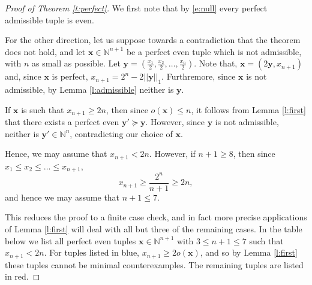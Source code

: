 \documentclass{article}
\begin{document}
\begin{proof}[Proof of Theorem \ref{t:perfect}]
We first note that by \eqref{e:null} every perfect admissible tuple is even.

For the other direction, let us suppose towards a contradiction that the theorem does not hold, and let $\bm{x} \in \mathbb{N}^{n+1}$ be a perfect even tuple which is not admissible, with $n$ as small as possible. Let $\bm{y} = \left(\frac{x_1}{2},\frac{x_2}{2},\ldots, \frac{x_n}{2}\right)$. Note that, $\bm{x} = (2\bm{y},x_{n+1})$ and, since $\bm{x}$ is perfect, $x_{n+1} = 2^n - 2||\bm{y}||_1$. Furthremore, since $\bm{x}$ is not admissible, by Lemma \ref{l:admissible} neither is $\bm{y}$.

If $\bm{x}$ is such that $x_{n+1} \geq 2n$, then since $o(\bm{x}) \leq n$, it follows from Lemma \ref{l:first} that there exists a perfect even $\bm{y'} \succeq \bm{y}$. However, since $\bm{y}$ is not admissible, neither is $\bm{y'} \in \mathbb{N}^n$, contradicting our choice of $\bm{x}$.

Hence, we may assume that $x_{n+1} < 2n$. However, if $n+1 \geq 8$, then since $x_1\leq x_2 \leq \ldots \leq x_{n+1}$,
\begin{equation} \label{e:dim}
x_{n+1} \geq \frac{2^n}{n+1} \geq 2n,
\end{equation}
and hence we may assume that $n+1 \leq 7$.

This reduces the proof to a finite case check, and in fact more precise applications of Lemma \ref{l:first} will deal with all but three of the remaining cases. In the table below we list all perfect even tuples $\bm{x} \in \mathbb{N}^{n+1}$ with $3\leq n+1 \leq 7$ such that $x_{n+1} < 2n$. For tuples listed in blue, $x_{n+1} \geq 2o(\bm{x})$, and so by Lemma \ref{l:first} these tuples cannot be minimal counterexamples. The remaining tuples are listed in red.


\end{proof}
\end{document}
